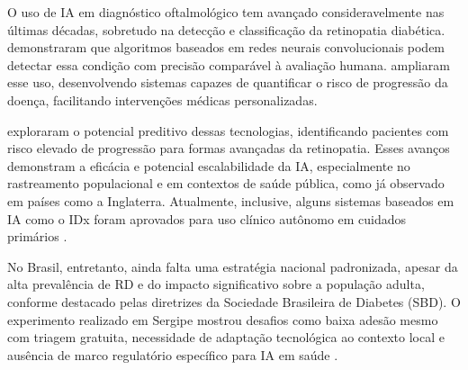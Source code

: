 O uso de IA em diagnóstico oftalmológico tem avançado consideravelmente nas últimas décadas, sobretudo na detecção e classificação da retinopatia diabética. \cite{gulshan_development_2016} demonstraram que algoritmos baseados em redes neurais convolucionais podem detectar essa condição com precisão comparável à avaliação humana. \cite{abramoff_pivotal_2018} ampliaram esse uso, desenvolvendo sistemas capazes de quantificar o risco de progressão da doença, facilitando intervenções médicas personalizadas.

\cite{ting_development_2017} exploraram o potencial preditivo dessas tecnologias, identificando pacientes com risco elevado de progressão para formas avançadas da retinopatia. Esses avanços demonstram a eficácia e potencial escalabilidade da IA, especialmente no rastreamento populacional e em contextos de saúde pública, como já observado em países como a Inglaterra. Atualmente, inclusive, alguns sistemas baseados em IA como o IDx foram aprovados para uso clínico autônomo em cuidados primários \cite{topol_high-performance_2019}.

No Brasil, entretanto, ainda falta uma estratégia nacional padronizada, apesar da alta prevalência de RD e do impacto significativo sobre a população adulta, conforme destacado pelas diretrizes da Sociedade Brasileira de Diabetes (SBD). O experimento realizado em Sergipe mostrou desafios como baixa adesão mesmo com triagem gratuita, necessidade de adaptação tecnológica ao contexto local e ausência de marco regulatório específico para IA em saúde \cite{korn_malerbi_feasibility_2022}.